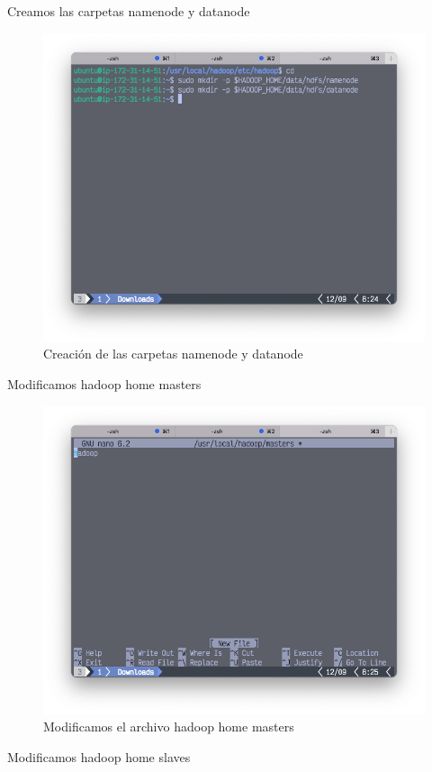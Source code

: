 Creamos las carpetas namenode y datanode
\begin{figure}[h]
	\centering
	\includegraphics[scale=.35] {img/38-make-namenode}
	\caption{Creación de las carpetas namenode y datanode}
	\label{fig:38}	
\end{figure}
Modificamos hadoop home masters
\begin{figure}[h]
	\centering
	\includegraphics[scale=.35] {img/39-nano-hadoop_home-masters}
	\caption{Modificamos el archivo hadoop home masters}
	\label{fig:39}	
\end{figure}
\clearpage
Modificamos hadoop home slaves

